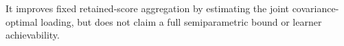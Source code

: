 It improves fixed retained-score aggregation by estimating the joint covariance-optimal loading, but does not claim a full semiparametric bound or learner achievability.